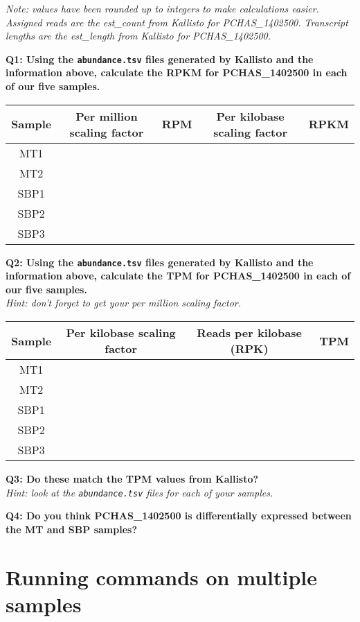 \documentclass[11pt]{article}
\begin{document}
\textit{Note: values have been rounded up to integers to make calculations
easier. Assigned reads are the est\_count from Kallisto for
PCHAS\_1402500. Transcript lengths are the est\_length from Kallisto for
PCHAS\_1402500.}

\textbf{Q1: Using the \texttt{abundance.tsv} files generated by Kallisto
and the information above, calculate the RPKM for PCHAS\_1402500 in each
of our five samples.}

\begin{longtable}[]{@{}ccccc@{}}
\hline
Sample & Per million scaling factor & RPM & Per kilobase scaling factor
& RPKM\tabularnewline
\hline
\endhead
MT1 & & & &\tabularnewline
MT2 & & & &\tabularnewline
SBP1 & & & &\tabularnewline
SBP2 & & & &\tabularnewline
SBP3 & & & &\tabularnewline
\hline
\end{longtable}

\textbf{Q2: Using the \texttt{abundance.tsv} files generated by Kallisto
and the information above, calculate the TPM for PCHAS\_1402500 in each
of our five samples.}\\
\textit{Hint: don't forget to get your per million scaling factor.}

\begin{longtable}[]{@{}cccc@{}}
\hline
Sample & Per kilobase scaling factor & Reads per kilobase (RPK) &
TPM\tabularnewline
\hline
\endhead
MT1 & & &\tabularnewline
MT2 & & &\tabularnewline
SBP1 & & &\tabularnewline
SBP2 & & &\tabularnewline
SBP3 & & &\tabularnewline
\hline
\end{longtable}


\newpage

\textbf{Q3: Do these match the TPM values from Kallisto?}\\
\textit{Hint: look at the \texttt{abundance.tsv} files for each of your
samples.}

\textbf{Q4: Do you think PCHAS\_1402500 is differentially expressed
between the MT and SBP samples?}





\newpage





    \hypertarget{running-commands-on-multiple-samples}{%
\section{Running commands on multiple
samples}\label{running-commands-on-multiple-samples}}
\end{document}
